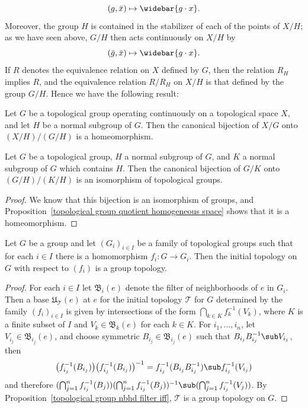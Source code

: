 \[(g,\bar{x})\mapsto\widebar{g\cdot x}.\]
Moreover, the group $H$ is contained in the stabilizer of each of the points of $X/H$; as we have seen above, $G/H$ then acts continuously on $X/H$ by
\[(\bar{g},\bar{x})\mapsto\widebar{g\cdot x}.\]
If $R$ denotes the equivalence relation on $X$ defined by $G$, then the relation $R_H$ implies $R$, and the equivalence relation $R/R_H$ on $X/H$ is that defined by the group $G/H$. Hence we have the following result:
\begin{proposition}\label{topological group quotient homogeneous space}
Let $G$ be a topological group operating continuously on a topological space $X$, and let $H$ be a normal subgroup of $G$. Then the canonical bijection of $X/G$ onto $(X/H)/(G/H)$ is a homeomorphism.
\end{proposition}
\begin{corollary}\label{topological group second isomorphism thm}
Let $G$ be a topological group, $H$ a normal subgroup of $G$, and $K$ a normal subgroup of $G$ which contains $H$. Then the canonical bijection of $G/K$ onto $(G/H)/(K/H)$ is an isomorphism of topological groups.
\end{corollary}
\begin{proof}
We know that this bijection is an isomorphism of groups, and Proposition~\ref{topological group quotient homogeneous space} shows that it is a homeomorphism.
\end{proof}
\begin{proposition}
Let $G$ be a group and let $(G_i)_{i\in I}$ be a family of topological groups such that for each $i\in I$ there is a homomorphism $f_i:G\to G_i$. Then the initial topology on $G$ with respect to $(f_i)$ is a group topology.
\end{proposition}
\begin{proof}
For each $i\in I$ let $\mathfrak{B}_i(e)$ denote the filter of neighborhoods of $e$ in $G_i$. Then a base $\mathfrak{U}_{\mathcal{T}}(e)$ at $e$ for the initial topology $\mathcal{T}$ for $G$ determined by the family $(f_i)_{i\in I}$ is given by intersections of the form $\bigcap_{k\in K}f_k^{-1}(V_k)$, where $K$ is a finite subset of $I$ and $V_k\in\mathfrak{B}_k(e)$ for each $k\in K$. For $i_1,\dots,i_n$, let $V_{i_j}\in\mathfrak{B}_{i_j}(e)$, and choose symmetric $B_{i_j}\in\mathfrak{B}_{i_j}(e)$ such that $B_{i_j}B_{i_j}^{-1}\sub V_{i_j}$, then
\[\big(f_{i_j}^{-1}(B_{i_j})\big)\big(f_{i_j}^{-1}(B_{i_j})\big)^{-1}=f_{i_j}^{-1}(B_{i_j}B_{i_j}^{-1})\sub f_{i_j}^{-1}(V_{i_j})\]
and therefore $(\bigcap_{j=1}^{n}f_{i_j}^{-1}(B_j))(\bigcap_{j=1}^{n}f_{i_j}^{-1}(B_j))^{-1}\sub(\bigcap_{j=1}^{n}f_{i_j}^{-1}(V_j))$. By Proposition~\ref{topological group nbhd filter iff}, $\mathcal{T}$ is a group topology on $G$.
\end{proof}
